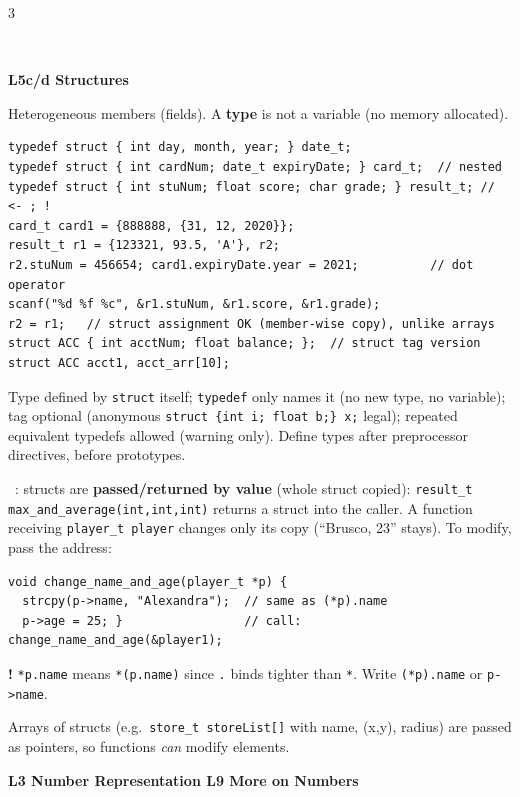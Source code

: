 \documentclass[landscape]{article}
\newcommand{\bigsec}[2]{\colorlet{cur}{#1}%
  \par\vspace{2pt}\noindent\colorbox{cur}{\parbox{\dimexpr\linewidth-2\fboxsep}{\centering\color{white}\bfseries\small #2}}\par\vspace{1pt}}
\newcommand{\sect}[1]{\par\vspace{2pt}\noindent{\color{cur}\rule[-1.5pt]{\linewidth}{0.4pt}}\\[-7.5pt]%
  \noindent\colorbox{cur!12}{\parbox{\dimexpr\linewidth-2\fboxsep}{\color{cur}\bfseries #1}}\par\vspace{0.5pt}}
\newcommand{\sub}[1]{\par\vspace{1pt}{\color{cur}\bfseries #1}\ }
\newcommand{\key}[1]{\textbf{\color{BrickRed}#1}}
\newcommand{\warn}[1]{\par\noindent\colorbox{red!10}{\parbox{\dimexpr\linewidth-2\fboxsep}{\textcolor{red!70!black}{\textbf{!} } #1}}\par}
\newcommand{\tc}[1]{\texttt{#1}}
\newlength{\fu}\setlength{\fu}{5.4pt}
\begin{document}
\begin{multicols*}{3}
\sect{L5c/d \; Structures}
Heterogeneous members (fields). A \key{type} is not a variable (no memory allocated).
\begin{lstlisting}
typedef struct { int day, month, year; } date_t;
typedef struct { int cardNum; date_t expiryDate; } card_t;  // nested
typedef struct { int stuNum; float score; char grade; } result_t; // <- ; !
card_t card1 = {888888, {31, 12, 2020}};
result_t r1 = {123321, 93.5, 'A'}, r2;
r2.stuNum = 456654; card1.expiryDate.year = 2021;          // dot operator
scanf("%d %f %c", &r1.stuNum, &r1.score, &r1.grade);
r2 = r1;   // struct assignment OK (member-wise copy), unlike arrays
struct ACC { int acctNum; float balance; };  // struct tag version
struct ACC acct1, acct_arr[10];
\end{lstlisting}
Type defined by \tc{struct} itself; \tc{typedef} only names it (no new type, no variable); tag optional (anonymous \tc{struct \{int i; float b;\} x;} legal); repeated equivalent typedefs allowed (warning only). Define types after preprocessor directives, before prototypes.\\
\sub{Functions}: structs are \key{passed/returned by value} (whole struct copied): \tc{result\_t max\_and\_average(int,int,int)} returns a struct into the caller. A function receiving \tc{player\_t player} changes only its copy (``Brusco, 23'' stays). To modify, pass the address:
\begin{lstlisting}
void change_name_and_age(player_t *p) {
  strcpy(p->name, "Alexandra");  // same as (*p).name
  p->age = 25; }                 // call: change_name_and_age(&player1);
\end{lstlisting}
\warn{\tc{*p.name} means \tc{*(p.name)} since \tc{.} binds tighter than \tc{*}. Write \tc{(*p).name} or \tc{p->name}.}
Arrays of structs (e.g.\ \tc{store\_t storeList[]} with name, (x,y), radius) are passed as pointers, so functions \emph{can} modify elements.
\bigsec{secB}{L3 Number Representation \;\textbar\; L9 More on Numbers}


\end{multicols*}
\end{document}
